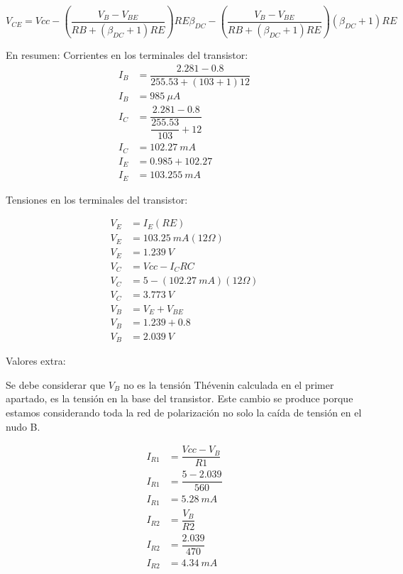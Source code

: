   \begin{equation}
      V_{CE} = Vcc-\left(\dfrac{V_B-V_{BE}}{RB+(\beta_{DC}+1)RE}\right)RE\beta_{DC}-\left(\dfrac{V_B-V_{BE}}{RB+(\beta_{DC}+1)RE}\right)(\beta_{DC}+1)RE
    \end{equation}

    En resumen:
    Corrientes en los terminales del transistor:
\begin{equation}
  \begin{split}
    I_B & = \dfrac{2.281-0.8}{255.53+(103+1)12}\\
    I_B & = 985 \ \mu A\\
    I_C & = \dfrac{2.281-0.8}{\dfrac{255.53}{103}+12}\\
    I_C & = 102.27 \  mA\\
    I_E & = 0.985 + 102.27\\
    I_E & = 103.255 \  mA
  \end{split}
\end{equation}

Tensiones en los terminales del transistor:

\begin{equation}
  \begin{split}
    V_E & =I_E(RE)\\
    V_E & =103.25 \ mA(12 \Omega)\\
    V_E & = 1.239 \ V\\
    V_C & =Vcc-I_CRC\\
    V_C & =5-(102.27 \ mA)(12 \Omega)\\
    V_C & = 3.773 \ V\\
    V_B & =V_E+V_{BE}\\
    V_B & = 1.239 + 0.8\\
    V_B & = 2.039 \ V
  \end{split}
\end{equation}

Valores extra:

Se debe considerar que $V_B$ no es la tensión Thévenin calculada en el
primer apartado, es la tensión en la base del transistor. Este cambio
se produce porque estamos considerando toda la red de polarización no
solo la caída de tensión en el nudo B.

\begin{equation}
  \begin{split}
    I_{R1} & = \dfrac{Vcc-V_B}{R1}\\
    I_{R1} & = \dfrac{5-2.039}{560}\\
    I_{R1} & = 5.28 \ mA \\
    I_{R2} & = \dfrac{V_B}{R2} \\
    I_{R2} & = \dfrac{2.039}{470}\\
    I_{R2} & = 4.34 \ mA
  \end{split}
\end{equation}


